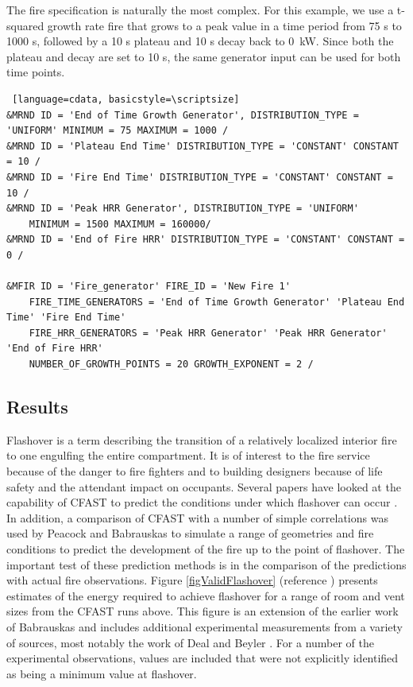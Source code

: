 \documentclass[12pt,twoside]{book}
\begin{document}
The fire specification is naturally the most complex. For this example, we use a t-squared growth rate fire that grows to a peak value in a time period from 75 s to 1000 s, followed by a 10 s plateau and 10 s decay back to 0~kW. Since both the plateau and decay are set to 10 s, the same generator input can be used for both time points.
\vspace{\baselineskip}
\begin{lstlisting} [language=cdata, basicstyle=\scriptsize]
&MRND ID = 'End of Time Growth Generator', DISTRIBUTION_TYPE = 'UNIFORM' MINIMUM = 75 MAXIMUM = 1000 /
&MRND ID = 'Plateau End Time' DISTRIBUTION_TYPE = 'CONSTANT' CONSTANT = 10 /
&MRND ID = 'Fire End Time' DISTRIBUTION_TYPE = 'CONSTANT' CONSTANT = 10 /
&MRND ID = 'Peak HRR Generator', DISTRIBUTION_TYPE = 'UNIFORM'
	MINIMUM = 1500 MAXIMUM = 160000/
&MRND ID = 'End of Fire HRR' DISTRIBUTION_TYPE = 'CONSTANT' CONSTANT = 0 /

&MFIR ID = 'Fire_generator' FIRE_ID = 'New Fire 1'
	FIRE_TIME_GENERATORS = 'End of Time Growth Generator' 'Plateau End Time' 'Fire End Time'
	FIRE_HRR_GENERATORS = 'Peak HRR Generator' 'Peak HRR Generator' 'End of Fire HRR'
	NUMBER_OF_GROWTH_POINTS = 20 GROWTH_EXPONENT = 2 /
\end{lstlisting}

\subsection{Results}

Flashover is a term describing the transition of a relatively localized interior fire to one engulfing the entire compartment. It is of interest to the fire service because of the danger to fire fighters and to building designers because of life safety and the attendant impact on occupants. Several papers have looked at the capability of CFAST to predict the conditions under which flashover can occur \cite{Valid:Chow_Flashover, Valid:Luo_Flashover, Valid:Collier, Valid:White}. In addition, a comparison of CFAST with a number of simple correlations was used by Peacock and Babrauskas \cite{Valid:Peacock_Flashover_1,Valid:Peacock_Flashover_2} to simulate a range of geometries and fire conditions to predict the development of the fire up to the point of flashover. The important test of  these prediction methods is in the comparison of the predictions with actual fire observations. Figure \ref{figValidFlashover} (reference \cite{Valid:Peacock_Flashover_2}) presents estimates of the energy required to achieve flashover for a range of room and vent sizes from the CFAST runs above. This figure is an extension of the earlier work of Babrauskas  \cite{Valid:Babrauskas_Flashover} and includes additional experimental measurements from a variety of sources, most notably the work of Deal and Beyler \cite{Valid:DealandBeyler}. For a number of the experimental observations, values are included that were not explicitly identified as being a minimum value at flashover.
\end{document}
